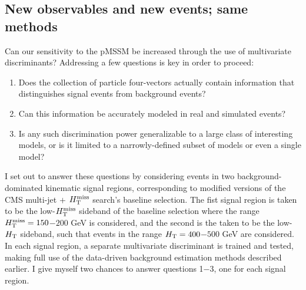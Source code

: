 \subsection{New observables and new events; same methods}
Can our sensitivity to the pMSSM be increased through the use of multivariate discriminants? Addressing a few questions is key in order to proceed: 
\begin{enumerate}
\item Does the collection of particle four-vectors actually contain information that distinguishes signal events from background events?
\item Can this information be accurately modeled in real and simulated events?
\item Is any such discrimination power generalizable to a large class of interesting models, or is it limited to a narrowly-defined subset of models or even a single model?
\end{enumerate}
I set out to answer these questions by considering events in two background-dominated kinematic signal regions, corresponding to modified versions of the CMS multi-jet $+$ $H_{\text{T}}^{\rm miss}$ search's \cite{Khachatryan:2016kdk} baseline selection. The fist signal region is taken to be the low-$H_{\text{T}}^{\rm miss}$ sideband of the \cite{Khachatryan:2016kdk} baseline selection where the range $H_{\text{T}}^{\rm miss}=150$$-$$200$ GeV is considered, and the second is the taken to be the low-$H_{\rm T}$  sideband, such that events in the range $H_{\rm T}=400$$-$$500$ GeV are considered. In each signal region, a separate multivariate discriminant is trained and tested, making full use of the data-driven background estimation methods described earlier. I give myself two chances to answer questions 1$-$3, one for each signal region.


